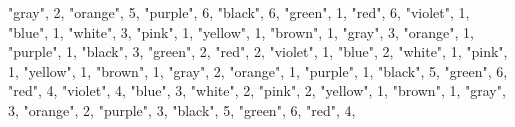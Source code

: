 \documentclass[
]{article}
\newenvironment{Shaded}{\begin{snugshade}}{\end{snugshade}}
\newcommand{\DecValTok}[1]{\textcolor[rgb]{0.00,0.00,0.81}{#1}}
\newcommand{\NormalTok}[1]{#1}
\newcommand{\StringTok}[1]{\textcolor[rgb]{0.31,0.60,0.02}{#1}}
\begin{document}
\begin{Shaded}
\begin{Highlighting}[]
  \StringTok{"gray"}\NormalTok{, }\DecValTok{2}\NormalTok{,}
  \StringTok{"orange"}\NormalTok{, }\DecValTok{5}\NormalTok{,}
  \StringTok{"purple"}\NormalTok{, }\DecValTok{6}\NormalTok{,}
    \StringTok{"black"}\NormalTok{, }\DecValTok{6}\NormalTok{,}
  \StringTok{"green"}\NormalTok{, }\DecValTok{1}\NormalTok{,}
  \StringTok{"red"}\NormalTok{, }\DecValTok{6}\NormalTok{,}
  \StringTok{"violet"}\NormalTok{, }\DecValTok{1}\NormalTok{,}
  \StringTok{"blue"}\NormalTok{, }\DecValTok{1}\NormalTok{,}
  \StringTok{"white"}\NormalTok{, }\DecValTok{3}\NormalTok{,}
  \StringTok{"pink"}\NormalTok{, }\DecValTok{1}\NormalTok{,}
  \StringTok{"yellow"}\NormalTok{, }\DecValTok{1}\NormalTok{,}
  \StringTok{"brown"}\NormalTok{, }\DecValTok{1}\NormalTok{,}
  \StringTok{"gray"}\NormalTok{, }\DecValTok{3}\NormalTok{,}
  \StringTok{"orange"}\NormalTok{, }\DecValTok{1}\NormalTok{,}
  \StringTok{"purple"}\NormalTok{, }\DecValTok{1}\NormalTok{,}
    \StringTok{"black"}\NormalTok{, }\DecValTok{3}\NormalTok{,}
  \StringTok{"green"}\NormalTok{, }\DecValTok{2}\NormalTok{,}
  \StringTok{"red"}\NormalTok{, }\DecValTok{2}\NormalTok{,}
  \StringTok{"violet"}\NormalTok{, }\DecValTok{1}\NormalTok{,}
  \StringTok{"blue"}\NormalTok{, }\DecValTok{2}\NormalTok{,}
  \StringTok{"white"}\NormalTok{, }\DecValTok{1}\NormalTok{,}
  \StringTok{"pink"}\NormalTok{, }\DecValTok{1}\NormalTok{,}
  \StringTok{"yellow"}\NormalTok{, }\DecValTok{1}\NormalTok{,}
  \StringTok{"brown"}\NormalTok{, }\DecValTok{1}\NormalTok{,}
  \StringTok{"gray"}\NormalTok{, }\DecValTok{2}\NormalTok{,}
  \StringTok{"orange"}\NormalTok{, }\DecValTok{1}\NormalTok{,}
  \StringTok{"purple"}\NormalTok{, }\DecValTok{1}\NormalTok{,}
    \StringTok{"black"}\NormalTok{, }\DecValTok{5}\NormalTok{,}
  \StringTok{"green"}\NormalTok{, }\DecValTok{6}\NormalTok{,}
  \StringTok{"red"}\NormalTok{, }\DecValTok{4}\NormalTok{, }
  \StringTok{"violet"}\NormalTok{, }\DecValTok{4}\NormalTok{, }
  \StringTok{"blue"}\NormalTok{, }\DecValTok{3}\NormalTok{,}
  \StringTok{"white"}\NormalTok{, }\DecValTok{2}\NormalTok{,}
  \StringTok{"pink"}\NormalTok{, }\DecValTok{2}\NormalTok{,}
  \StringTok{"yellow"}\NormalTok{, }\DecValTok{1}\NormalTok{,}
  \StringTok{"brown"}\NormalTok{, }\DecValTok{1}\NormalTok{,}
  \StringTok{"gray"}\NormalTok{, }\DecValTok{3}\NormalTok{,}
  \StringTok{"orange"}\NormalTok{, }\DecValTok{2}\NormalTok{,}
  \StringTok{"purple"}\NormalTok{, }\DecValTok{3}\NormalTok{,}
    \StringTok{"black"}\NormalTok{, }\DecValTok{5}\NormalTok{,}
  \StringTok{"green"}\NormalTok{, }\DecValTok{6}\NormalTok{,}
  \StringTok{"red"}\NormalTok{, }\DecValTok{4}\NormalTok{, }

\end{Highlighting}
\end{Shaded}
\end{document}
